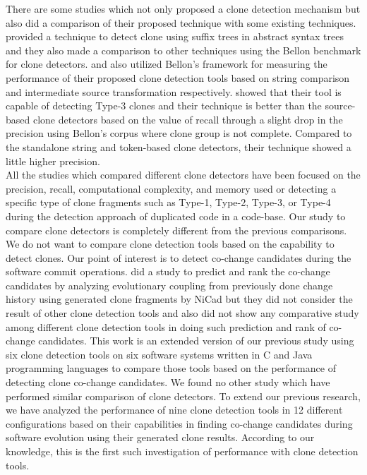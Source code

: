 \documentclass[review]{elsarticle}
\begin{document}
There are some studies which not only proposed a clone detection mechanism but also did a comparison of their proposed technique with some existing techniques. \citet{astDetectionComparisonBellon} provided a technique to detect clone using suffix trees in abstract syntax trees and they also made a comparison to other techniques using the Bellon benchmark for clone detectors. \citet{DucasseStringMatchingCloneBallon} and \citet{CloneIntermediateRepresentationBallon} also utilized Bellon’s framework for measuring the performance of their proposed clone detection tools based on string comparison and intermediate source transformation respectively. \citet{CloneIntermediateRepresentationBallon} showed that their tool is capable of detecting Type-3 clones and their technique is better than the source-based clone detectors based on the value of recall through a slight drop in the precision using Bellon’s corpus where clone group is not complete. Compared to the standalone string and token-based clone detectors, their technique showed a little higher precision.\\
All the studies which compared different clone detectors have been focused on the precision, recall, computational complexity, and memory used or detecting a specific type of clone fragments such as Type-1, Type-2, Type-3, or Type-4 during the detection approach of duplicated code in a code-base. Our study to compare clone detectors is completely different from the previous comparisons. We do not want to compare clone detection tools based on the capability to detect clones. Our point of interest is to detect co-change candidates during the software commit operations. \citet{Mondal-2014-PRC-2597073-2597104rankingCoChange} did a study to predict and rank the co-change candidates by analyzing evolutionary coupling from previously done change history using generated clone fragments by NiCad but they did not consider the result of other clone detection tools and also did not show any comparative study among different clone detection tools in doing such prediction and rank of co-change candidates. This work is an extended version of our previous study \cite{nadim-iwsc-2020} using six clone detection tools on six software systems written in C and Java programming languages to compare those tools based on the performance of detecting clone co-change candidates.  We found no other study which have performed similar comparison of clone detectors. To extend our previous research, we have analyzed the performance of nine clone detection tools in 12 different configurations based on their capabilities in finding co-change candidates during software evolution using their generated clone results. According to our knowledge, this is the first such investigation of performance with clone detection tools. 
\end{document}
